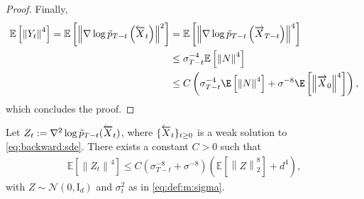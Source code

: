 \documentclass[english,graybox,envcountchap,envcountsame,sectrefs,shortlabels]{svmono}
\theoremstyle{style}
\newcommand{\eqsp}{}
\begin{document}
\begin{proof}
Finally,
\begin{align*}
    \mathbb{E}  \left[ \left\| Y_t \right\|^4  \right]      = \mathbb{E}  \left[ \left\| \nabla \log \tilde p_{T-t} \left( \ola X_t \right) \right\|^2  \right]
    &= \mathbb{E}  \left[ \left\| \nabla \log \tilde p_{T-t} \left( \ora X_{T-t} \right) \right\|^4  \right] \\
    &\leq \sigma_{T-t}^{-4}\mathbb{E}  \left[ \left\| N \right\|^4 \right]
    \\ &\leq C \left(
    \sigma_{T-t}^{-4}
    \E\left[\left\| N \right\|^4\right] + \sigma^{-8} \E\left[\left\| \ora X_0 \right\|^4 \right]
     \right)\eqsp,
\end{align*}
which concludes the proof.
\end{proof}

\begin{lemma} \label{second derivative moment bound}
Let $Z_t := \nabla^2 \log \tilde p_{T-t} ( \overleftarrow X_t )$, where $\{\overleftarrow X_t\}_{t\geq 0}$ is a weak solution to \eqref{eq:backward:sde}. There exists a constant $C>0$ such that
\begin{align}\label{eq:moment4_Z}
\mathbb{E} \left[ \left\| Z_t \right\|^4 \right] \leq C \left(\sigma^{-8}_{T-t}+ \sigma^{-8}\right) \left( \mathbb{E} \left[ \left\|   Z \right\|^8_2 \right] + d^4 \right)
\eqsp,
\end{align}
with $Z\sim\mathcal{N}(0,\mathrm{I}_d)$ and $\sigma_t^2$ as in \eqref{eq:def:m:sigma}.
\end{lemma}
\end{document}
